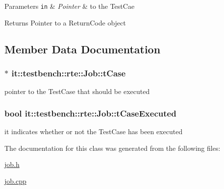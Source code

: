 \begin{DoxyParams}[1]{Parameters}
\mbox{\tt in}  & {\em Pointer} & to the Test\-Cae \\
\hline
\end{DoxyParams}
\begin{DoxyReturn}{Returns}
Pointer to a Return\-Code object 
\end{DoxyReturn}


\subsection{Member Data Documentation}
\hypertarget{classit_1_1testbench_1_1rte_1_1Job_ade77aa87844c9e4592804cd21a1fade9}{
\subsubsection[{t\-Case}]{$\ast$ it\-::testbench\-::rte\-::\-Job\-::t\-Case\hspace{0.3cm}{\ttfamily [private]}}}\label{d2/d1b/classit_1_1testbench_1_1rte_1_1Job_ade77aa87844c9e4592804cd21a1fade9}
pointer to the Test\-Case that should be executed \hypertarget{classit_1_1testbench_1_1rte_1_1Job_a5fff59f69e2405a6889ecde64981d5a2}{
\subsubsection[{t\-Case\-Executed}]{\setlength{\rightskip}{0pt plus 5cm}bool it\-::testbench\-::rte\-::\-Job\-::t\-Case\-Executed\hspace{0.3cm}{\ttfamily [private]}}}\label{d2/d1b/classit_1_1testbench_1_1rte_1_1Job_a5fff59f69e2405a6889ecde64981d5a2}
it indicates whether or not the Test\-Case has been executed 

The documentation for this class was generated from the following files\-:\begin{DoxyCompactItemize}
\item 
\hyperlink{job_8h}{job.\-h}\item 
\hyperlink{job_8cpp}{job.\-cpp}\end{DoxyCompactItemize}
